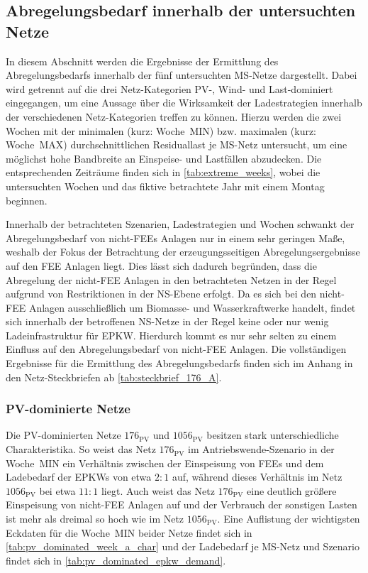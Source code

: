 \subsection{Abregelungsbedarf innerhalb der untersuchten Netze}\label{chap:cur_results}

In diesem Abschnitt werden die Ergebnisse der Ermittlung des Abregelungsbedarfs innerhalb der fünf untersuchten \gls{MS}-Netze dargestellt.
Dabei wird getrennt auf die drei Netz-Kategorien \gls{PV}-, Wind- und Last-dominiert eingegangen, um eine Aussage über die Wirksamkeit der Ladestrategien innerhalb der verschiedenen Netz-Kategorien treffen zu können.
Hierzu werden die zwei Wochen mit der minimalen (kurz: Woche~MIN) bzw. maximalen (kurz: Woche~MAX) durchschnittlichen Residuallast je \gls{MS}-Netz untersucht, um eine möglichst hohe Bandbreite an Einspeise- und Lastfällen abzudecken.
Die entsprechenden Zeiträume finden sich in \autoref{tab:extreme_weeks}, wobei die untersuchten Wochen und das fiktive betrachtete Jahr mit einem Montag beginnen.



Innerhalb der betrachteten Szenarien, Ladestrategien und Wochen schwankt der Abregelungsbedarf von nicht-\glspl{FEE} Anlagen nur in einem sehr geringen Maße, weshalb der Fokus der Betrachtung der erzeugungsseitigen Abregelungsergebnisse auf den \gls{FEE} Anlagen liegt.
Dies lässt sich dadurch begründen, dass die Abregelung der nicht-\gls{FEE} Anlagen in den betrachteten Netzen in der Regel aufgrund von Restriktionen in der \gls{NS}-Ebene erfolgt.
Da es sich bei den nicht-\gls{FEE} Anlagen ausschließlich um Biomasse- und Wasserkraftwerke handelt, findet sich innerhalb der betroffenen \gls{NS}-Netze in der Regel keine oder nur wenig Ladeinfrastruktur für \gls{EPKW}.
Hierdurch kommt es nur sehr selten zu einem Einfluss auf den Abregelungsbedarf von nicht-\gls{FEE} Anlagen.
Die vollständigen Ergebnisse für die Ermittlung des Abregelungsbedarfs finden sich im Anhang in den Netz-Steckbriefen ab \autoref{tab:steckbrief_176_A}.


\subsubsection{PV-dominierte Netze}

Die \gls{PV}-dominierten Netze \(176_{\text{PV}}\) und \(1056_{\text{PV}}\) besitzen stark unterschiedliche Charakteristika.
So weist das Netz \(176_{\text{PV}}\) im Antriebswende-Szenario in der Woche~MIN ein Verhältnis zwischen der Einspeisung von \glspl{FEE} und dem Ladebedarf der \glspl{EPKW} von etwa \(2:1\) auf, während dieses Verhältnis im Netz \(1056_{\text{PV}}\) bei etwa \(11:1\) liegt.
Auch weist das Netz \(176_{\text{PV}}\) eine deutlich größere Einspeisung von nicht-\gls{FEE} Anlagen auf und der Verbrauch der sonstigen Lasten ist mehr als dreimal so hoch wie im Netz \(1056_{\text{PV}}\).
Eine Auflistung der wichtigsten Eckdaten für die Woche~MIN beider Netze findet sich in \autoref{tab:pv_dominated_week_a_char} und der Ladebedarf je \gls{MS}-Netz und Szenario findet sich in \autoref{tab:pv_dominated_epkw_demand}.

